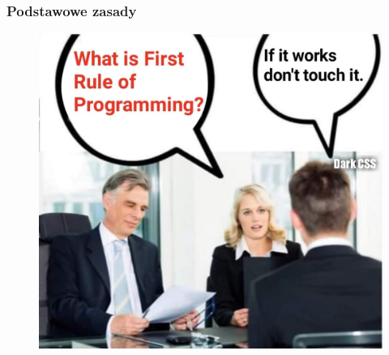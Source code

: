 \documentclass[10pt,t]{beamer}
\begin{document}
\begin{frame}
  \frametitle{Podstawowe zasady}


  \begin{figure}

    \centering

    \includegraphics[scale=0.21]
    {./PresentationsPictures/First-rule-of-programming.jpg}

  \end{figure}

\end{frame}
\end{document}
